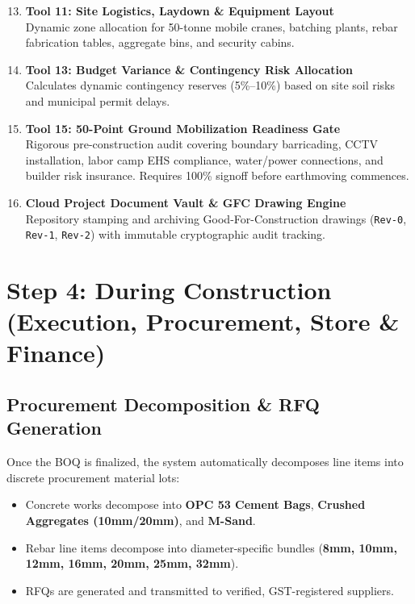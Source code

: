 \documentclass[11pt,a4paper]{article}
\begin{document}
\begin{enumerate}[leftmargin=*]
    \setcounter{enumi}{12}
    \item \textbf{Tool 11: Site Logistics, Laydown \& Equipment Layout} \\
    Dynamic zone allocation for 50-tonne mobile cranes, batching plants, rebar fabrication tables, aggregate bins, and security cabins.

    \item \textbf{Tool 13: Budget Variance \& Contingency Risk Allocation} \\
    Calculates dynamic contingency reserves (5\%--10\%) based on site soil risks and municipal permit delays.

    \item \textbf{Tool 15: 50-Point Ground Mobilization Readiness Gate} \\
    Rigorous pre-construction audit covering boundary barricading, CCTV installation, labor camp EHS compliance, water/power connections, and builder risk insurance. Requires 100\% signoff before earthmoving commences.

    \item \textbf{Cloud Project Document Vault \& GFC Drawing Engine} \\
    Repository stamping and archiving Good-For-Construction drawings (\texttt{Rev-0}, \texttt{Rev-1}, \texttt{Rev-2}) with immutable cryptographic audit tracking.
\end{enumerate}

\newpage

\section{Step 4: During Construction (Execution, Procurement, Store \& Finance)}

\subsection{Procurement Decomposition \& RFQ Generation}
Once the BOQ is finalized, the system automatically decomposes line items into discrete procurement material lots:
\begin{itemize}[noitemsep]
    \item Concrete works decompose into \textbf{OPC 53 Cement Bags}, \textbf{Crushed Aggregates (10mm/20mm)}, and \textbf{M-Sand}.
    \item Rebar line items decompose into diameter-specific bundles (\textbf{8mm, 10mm, 12mm, 16mm, 20mm, 25mm, 32mm}).
    \item RFQs are generated and transmitted to verified, GST-registered suppliers.
\end{itemize}
\end{document}
